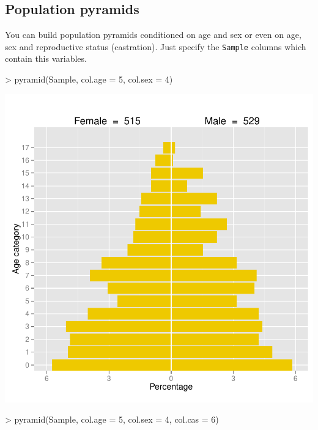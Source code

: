 \documentclass[a4paper]{article}
\begin{document}
\subsection{Population pyramids}
You can build population pyramids conditioned on age and sex or even on age, sex and reproductive status (castration). Just specify the \texttt{Sample} columns which contain this variables.
\begin{Schunk}
\begin{Sinput}
> pyramid(Sample, col.age = 5, col.sex = 4)
\end{Sinput}
\end{Schunk}
\begin{center}
\includegraphics{capm_example-pyramids1}
\end{center}
\begin{Schunk}
\begin{Sinput}
> pyramid(Sample, col.age = 5, col.sex = 4, col.cas = 6)
\end{Sinput}
\end{Schunk}
\end{document}
